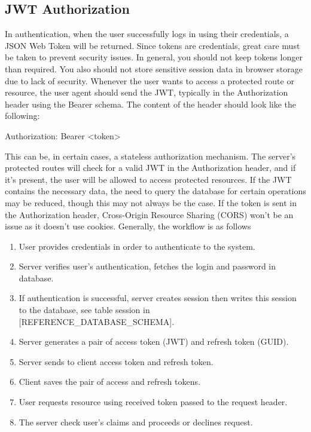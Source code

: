 \subsection{JWT Authorization}\label{subsec:jwt-authorization}
In authentication, when the user successfully logs in using their credentials, a JSON Web Token will be returned.
Since tokens are credentials, great care must be taken to prevent security issues.
In general, you should not keep tokens longer than required.
You also should not store sensitive session data in browser storage due to lack of security.
Whenever the user wants to access a protected route or resource, the user agent should send the JWT,
typically in the Authorization header using the Bearer schema.
The content of the header should look like the following:
\begin{spverbatim}

    Authorization: Bearer <token>

\end{spverbatim}
This can be, in certain cases, a stateless authorization mechanism.
The server's protected routes will check for a valid JWT in the Authorization header, and if it's present,
the user will be allowed to access protected resources.
If the JWT contains the necessary data, the need to query the database for certain operations may be reduced,
though this may not always be the case.
If the token is sent in the Authorization header, Cross-Origin Resource Sharing (CORS) won't be an issue
as it doesn't use cookies.
Generally, the workflow is as follows
\begin{enumerate}
    \item User provides credentials in order to authenticate to the system.
    \item Server verifies user's authentication, fetches the login and password in database.
    \item If authentication is successful, server creates session then writes this session to the database,
    see table session in [REFERENCE\_DATABASE\_SCHEMA].
    \item Server generates a pair of access token (JWT) and refresh token (GUID).
    \item Server sends to client access token and refresh token.
    \item Client saves the pair of access and refresh tokens.
    \item User requests resource using received token passed to the request header.
    \item The server check user's claims and proceeds or declines request.
\end{enumerate}

